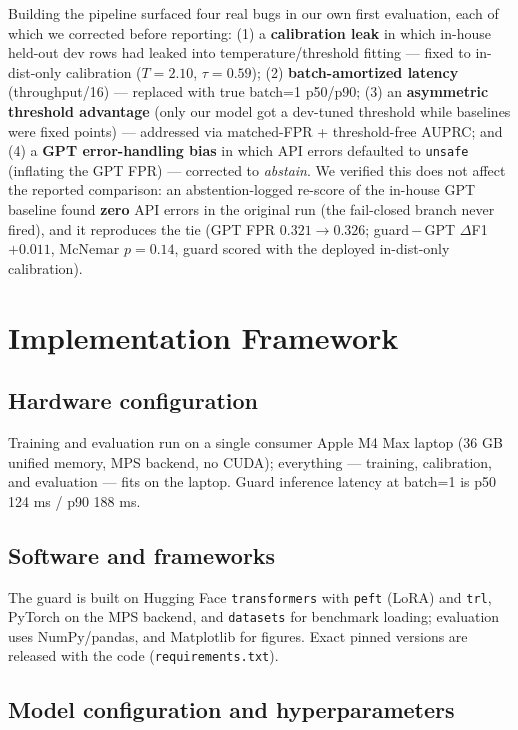 \documentclass[sigconf,nonacm]{acmart}
\begin{document}
Building the pipeline surfaced four real bugs in our own first evaluation, each of which we corrected before reporting: (1) a \textbf{calibration leak} in which in-house held-out dev rows had leaked into temperature/threshold fitting --- fixed to in-dist-only calibration ($T=2.10$, $\tau=0.59$); (2) \textbf{batch-amortized latency} (throughput/16) --- replaced with true batch=1 p50/p90; (3) an \textbf{asymmetric threshold advantage} (only our model got a dev-tuned threshold while baselines were fixed points) --- addressed via matched-FPR + threshold-free AUPRC; and (4) a \textbf{GPT error-handling bias} in which API errors defaulted to \texttt{unsafe} (inflating the GPT FPR) --- corrected to \emph{abstain}. We verified this does not affect the reported comparison: an abstention-logged re-score of the in-house GPT baseline found \textbf{zero} API errors in the original run (the fail-closed branch never fired), and it reproduces the tie (GPT FPR $0.321{\to}0.326$; guard\,$-$\,GPT $\Delta$F1 $+0.011$, McNemar $p{=}0.14$, guard scored with the deployed in-dist-only calibration).

\section{Implementation Framework}
\label{sec:impl}

\subsection{Hardware configuration}

Training and evaluation run on a single consumer Apple M4 Max laptop (36 GB unified memory, MPS backend, no CUDA); everything --- training, calibration, and evaluation --- fits on the laptop. Guard inference latency at batch=1 is p50 124 ms / p90 188 ms.

\subsection{Software and frameworks}

The guard is built on Hugging Face \texttt{transformers} with \texttt{peft} (LoRA) and \texttt{trl}, PyTorch on the MPS backend, and \texttt{datasets} for benchmark loading; evaluation uses NumPy/pandas, and Matplotlib for figures. Exact pinned versions are released with the code (\texttt{requirements.txt}).

\subsection{Model configuration and hyperparameters}
\end{document}
